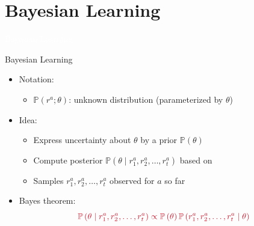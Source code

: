 \documentclass[11pt,table]{beamer}
\begin{document}
\section{Bayesian Learning}
{
\begin{frame}
\centering
\Huge
\textcolor{white}{Bayesian Learning}
\thispagestyle{empty}
\end{frame}
}


\begin{frame}{Bayesian Learning}


    \begin{itemize}
        \item Notation:

\begin{itemize}
     

	\item  $\mathbb{P}\left(r^{a} ; \theta\right)$: unknown distribution (parameterized by $\theta$)

    \end{itemize}

    \item Idea:
    \begin{itemize}
        \item Express uncertainty about $\theta$ by a prior $\mathbb{P}(\theta)$
\item  Compute posterior $\mathbb{P}\left(\theta\mid r_{1}^{a}, r_{2}^{a}, \ldots, r_{t}^{a}\right)$ based on
\item  Samples $r_{1}^{a}, r_{2}^{a}, \ldots, r_{t}^{a}$ observed for $a$ so far
    \end{itemize}

    \item \textcolor{red1}{Bayes theorem:}
$$\textcolor{red1}{\mathbb{P}\left(\theta \mid r_{1}^{a}, r_{2}^{a}, \ldots, r_{t}^{a}\right) \propto \mathbb{P}\left(\theta\right) \mathbb{P}\left(r_{1}^{a}, r_{2}^{a}, \ldots, r_{t}^{a} \mid \theta\right)}$$ 
    \end{itemize}
\end{frame}
\end{document}
